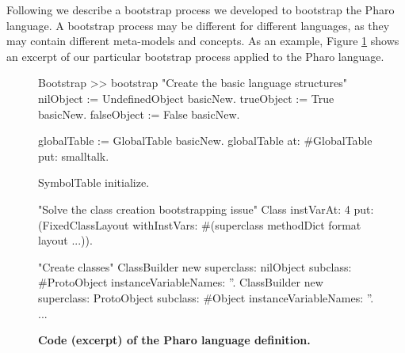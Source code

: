 Following we describe a bootstrap process we developed to bootstrap the Pharo language. A bootstrap process may be different for different languages, as they may contain different meta-models and concepts. As an example, Figure \ref{code:process} shows an excerpt of our particular bootstrap process applied to the Pharo language.

\begin{figure}[ht]
\begin{code}
Bootstrap >> bootstrap
    "Create the basic language structures"
    nilObject := UndefinedObject basicNew.
    trueObject := True basicNew.
    falseObject := False basicNew.
    
    globalTable := GlobalTable basicNew.
    globalTable at: #GlobalTable put: smalltalk.
    
    SymbolTable initialize.
    
    "Solve the class creation bootstrapping issue"
    Class
        instVarAt: 4
        put: (FixedClassLayout
            withInstVars: #(superclass methodDict format layout ...)).
    
    "Create classes"
    ClassBuilder new
        superclass: nilObject
        subclass: #ProtoObject
        instanceVariableNames: ''.
    ClassBuilder new
        superclass: ProtoObject
        subclass: #Object
        instanceVariableNames: ''.
    ...
\end{code}
\caption{\textbf{Code (excerpt) of the Pharo language definition.}\label{code:process}}
\end{figure}



%

